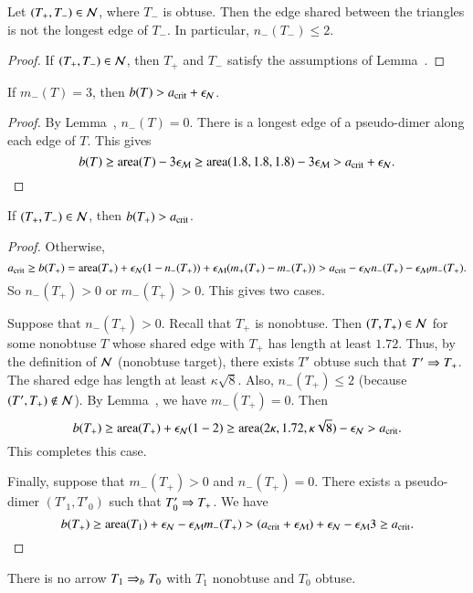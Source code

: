 \begin{corollary}  
  Let $(T_+,T_-)\in\mathcal N$, where $T_-$ is obtuse.  Then the edge shared
  between the triangles is not the longest edge of $T_-$.  In
  particular, $n_-(T_-)\le 2$.
\end{corollary}

\begin{proof} If $(T_+,T_-)\in \mathcal N$, then $T_+$ and $T_-$ satisfy the
  assumptions of Lemma~.
\end{proof}

\begin{lemma} 
If $m_-(T) = 3$, then $b(T) > a_\text{crit} + \epsilon_{\mathcal N}$.
\end{lemma}

\begin{proof}  By Lemma~, $n_-(T)=0$.
There is a longest edge of a pseudo-dimer along each edge of $T$.
This gives
\[
b(T) \ge {\operatorname{area}}(T) - 3\epsilon_{\mathcal M} \ge {\operatorname{area}}(1.8,1.8,1.8) - 3\epsilon_{\mathcal M} > a_\text{crit} + \epsilon_{\mathcal N}.
\]
\end{proof}

\begin{lemma}  
  If $(T_+,T_-)\in \mathcal N$, then $b(T_+)>a_\text{crit}$.
\end{lemma}

\begin{proof}  Otherwise,
\[
a_\text{crit} \ge b(T_+) 
= {\operatorname{area}}(T_+) + \epsilon_{\mathcal N} (1 - n_-(T_+)) + \epsilon_{\mathcal M} (m_+(T_+)-m_-(T_+)) 
> a_\text{crit} - \epsilon_{\mathcal N} n_-(T_+) - \epsilon_{\mathcal M} m_-(T_+).
\]
So $n_-(T_+) > 0$ or $m_-(T_+)>0$. This gives two cases.  

Suppose that $n_-(T_+) >0$.  Recall that $T_+$ is nonobtuse.  Then
$(T,T_+)\in\mathcal N$ for some nonobtuse $T$ whose shared edge with $T_+$ has
length at least $1.72$.  Thus, by the definition of $\mathcal N$ (nonobtuse
target), there exists $T'$ obtuse such that $T'\Rightarrow T_+$.  The shared
edge has length at least $\kappa\sqrt8$.  Also, $n_-(T_+)\le 2$
(because $(T',T_+)\not\in \mathcal N$).  By Lemma~, we have
$m_-(T_+)=0$.  Then
\[
b(T_+) \ge {\operatorname{area}}(T_+) + \epsilon_{\mathcal N} (1 - 2) 
\ge {\operatorname{area}} (2\kappa,1.72,\kappa\sqrt8) - \epsilon_{\mathcal N} > a_\text{crit}.
\]
This completes this case.

Finally, suppose that $m_-(T_+)>0$ and $n_-(T_+)=0$.  There exists a
pseudo-dimer $(T'_1,T'_0)$ such that $T'_0\Rightarrow T_+$.  We have
\[
b(T_+) \ge {\operatorname{area}}(T_1)+\epsilon_{\mathcal N} - \epsilon_{\mathcal M} m_-(T_+) 
> (a_\text{crit} + \epsilon_{\mathcal M}) + \epsilon_{\mathcal N} -\epsilon_{\mathcal M}  3 \ge a_\text{crit}.
\]
\end{proof}



\begin{lemma} 
  There is no arrow $T_1 \Rightarrow_{b} T_0$ with $T_1$ nonobtuse and $T_0$
  obtuse.
\end{lemma}


